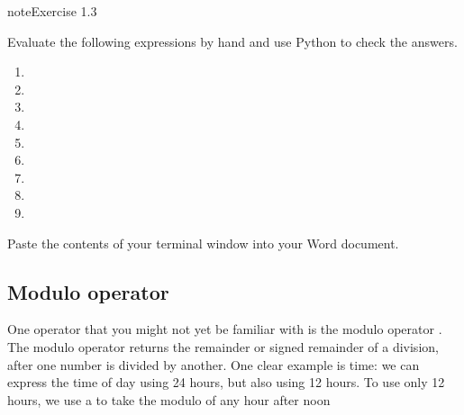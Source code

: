 \documentclass[letterpaper,10pt,english]{jupyterBook}
\begin{document}
\begin{sphinxVerbatim}[commandchars=\\\{\}]
\end{sphinxVerbatim}

\begin{sphinxadmonition}{note}{Exercise 1.3}

\sphinxAtStartPar
Evaluate the following expressions by hand and use Python to check the answers.
\begin{enumerate}
%
\item {} 
\sphinxAtStartPar
{}

\item {} 
\sphinxAtStartPar
{}

\item {} 
\sphinxAtStartPar
{}

\item {} 
\sphinxAtStartPar
{}

\item {} 
\sphinxAtStartPar
{}

\item {} 
\sphinxAtStartPar
{}

\item {} 
\sphinxAtStartPar
{}

\item {} 
\sphinxAtStartPar
{}

\item {} 
\sphinxAtStartPar
{}

\end{enumerate}

\sphinxAtStartPar
Paste the contents of your terminal window into your Word document.
\end{sphinxadmonition}


\subsection{Modulo operator}
\label{\detokenize{notebooks/01_GettingStarted/01_GettingStarted_student:modulo-operator}}
\sphinxAtStartPar
One operator that you might not yet be familiar with is the modulo operator \sphinxcode{\sphinxupquote{\%}}. The modulo operator returns the remainder or signed remainder of a division, after one number is divided by another. One clear example is time: we can express the time of day using 24 hours, but also using 12 hours. To use only 12 hours, we use a  to take the modulo of any hour after noon
\end{document}
